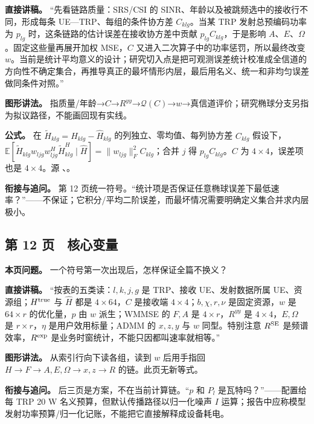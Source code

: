 \documentclass[11pt,a4paper]{ctexart}
\begin{document}
\textbf{直接讲稿。} “先看链路质量：SRS/CSI 的 SINR、年龄以及被跳频选中的接收行不同，形成每条 UE—TRP、每组的条件协方差 $C_{klg}$。当某 TRP 发射总预编码功率为 $p_{lg}$ 时，这条链路的估计误差在接收协方差中贡献 $p_{lg}C_{klg}$，于是影响 $A$、$E$、$\Omega$。固定这些量再展开加权 MSE，$C$ 又进入二次算子中的功率惩罚，所以最终改变 $w$。当前是统计平均意义的设计；研究切入点是把可观测误差统计校准成全信道的方向性不确定集合，再推导真正的最坏情形内层，最后用名义、统一和非均匀误差做同条件对照。”\par

\textbf{图形讲法。} 指质量/年龄→$C$→$R^{yy}$→$\mathcal Q(C)$→$w$→真信道评价；研究椭球分支另指为拟议路径，不能画回现有实线。\par

\textbf{公式。} 在 $\widetilde H_{klg}=H_{klg}-\widehat H_{klg}$ 的列独立、零均值、每列协方差 $C_{klg}$ 假设下，$\mathbb E[\widetilde H_{klg}w_{ljg}w_{ljg}^H\widetilde H_{klg}^H\mid\widehat H]=\|w_{ljg}\|_F^2C_{klg}$；合并 $j$ 得 $p_{lg}C_{klg}$。$C$ 为 $4\times4$，误差项也是 $4\times4$。源 、。\par

\textbf{衔接与追问。} 第 12 页统一符号。“统计项是否保证任意椭球误差下最低速率？”——不保证；它积分/平均二阶误差，而最坏情况需要明确定义集合并求内层极小。\par

\subsection*{第 12 页　核心变量}

\textbf{本页问题。} 一个符号第一次出现后，怎样保证全篇不换义？\par

\textbf{直接讲稿。} “按表的五类读：$l,k,j,g$ 是 TRP、接收 UE、发射数据所属 UE、资源组；$H^{\rm true}$ 与 $\widehat H$ 都是 $4\times64$，$C$ 是接收端 $4\times4$；$b,\chi,r,\nu$ 是固定资源，$w$ 是 $64\times r$ 的优化量，$p$ 由 $w$ 派生；WMMSE 的 $F,A$ 是 $4\times r$，$R^{yy}$ 是 $4\times4$，$E,\Omega$ 是 $r\times r$，$\eta$ 是用户效用标量；ADMM 的 $x,z,y$ 与 $w$ 同型。特别注意 $R^{\rm SE}$ 是频谱效率，$R^{\rm exp}$ 是业务时窗统计，不能只因都叫速率就相等。”\par

\textbf{图形讲法。} 从索引行向下读各组，读到 $w$ 后用手指回 $H\to F\to A,E,\Omega\to x,z\to R$ 的链。此页无新等式。\par

\textbf{衔接与追问。} 后三页是方案，不在当前计算链。“$p$ 和 $P_l$ 是瓦特吗？”——配置给每 TRP 20 W 名义预算，但默认传播路径以归一化噪声 $I$ 运算；报告中应称模型发射功率预算/归一化记账，不能把它直接解释成设备耗电。\par
\end{document}
